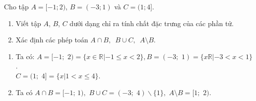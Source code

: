 \begin{bt}%
	Cho tập $A=[-1; 2)$, $B=(-3; 1)$ và $C=(1; 4]$.
	\begin{enumerate}
		\item Viết tập $A$, $B$, $C$ dưới dạng chỉ ra tính chất đặc trưng của các phần tử.
		\item Xác định các phép toán $ A\cap B,\,\,\,B\cup C,\,\,\,A\setminus B$.
	\end{enumerate}
	\loigiai
	{
		\begin{enumerate}
			\item Ta có: $A=[-1;\,\,2)=\{ x\in\mathbb{R}\left|-1\le x < 2\}\right.,B=(-3;\,\,1)=\{ x\mathbb{R}\left|-3 < x < 1\}\right.$.\\
			$C=(1;\,\,4]=\{ x\left|1 < x\le 4\}\right.$.
			\item Ta có $ A\cap B=[-1;\,1),\,\,B\cup C=(-3;\,\,4)\backslash{{\{}}1\},\,\,A\setminus B=[1;\,\,2)$.
		\end{enumerate}
	}
\end{bt}

